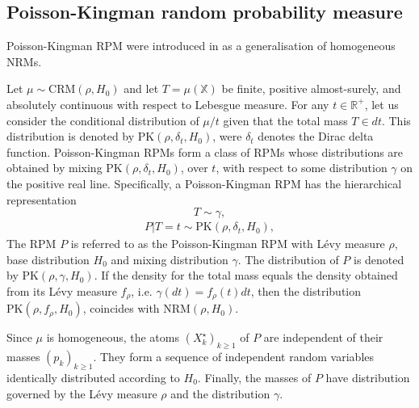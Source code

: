 
\subsection{Poisson-Kingman random probability measure} \label{PKP}
Poisson-Kingman \gls{RPM} were introduced in \cite{pitman2003pkp} as a generalisation of homogeneous NRMs. \\

\begin{definition} \label{def:PKRPM}
Let $\mu \sim \text{CRM}(\rho, H_0)$ and let $T = \mu(\mathbb{X})$ be finite, positive almost-surely, and absolutely continuous with respect to Lebesgue measure. For any $t \in \mathbb{R}^+$, let us consider the conditional distribution of $\mu/t$ given that the total mass $T \in dt$. This distribution is denoted by $\text{PK}(\rho, \delta_t , H_0)$, were $\delta_t$ denotes the Dirac delta function. Poisson-Kingman \glspl{RPM} form a class of \glspl{RPM} whose distributions are obtained by mixing $\text{PK}(\rho, \delta_t , H_0)$, over $t$, with respect to some distribution  $\gamma$ on the positive real line. Specifically, a Poisson-Kingman \gls{RPM} has the hierarchical representation
$$T \sim \gamma, $$
\vspace{-2em}
\begin{gather} \label{eq:PK}
P|T=t \sim \text{PK}(\rho, \delta_t, H_0),
\end{gather}
The \gls{RPM} $P$ is referred to as the Poisson-Kingman \gls{RPM} with Lévy measure $\rho$, base distribution $H_0$ and mixing distribution $\gamma$. The distribution of $P$ is denoted by $\text{PK}(\rho, \gamma , H_0)$. If the density for the total mass equals the density obtained from its Lévy measure $f_\rho$, i.e. $\gamma(dt) = f_\rho(t) dt$, then the distribution $\text{PK}(\rho, f_\rho , H_0)$, coincides with $\text{NRM} (\rho, H_0)$.
\end{definition}

Since $\mu$ is homogeneous, the atoms $\left(X^\star_k \right)_{k \ge 1}$ of $P$ are independent of their masses $\left(p_k \right)_{k \ge 1}$. They form a sequence of independent random variables identically distributed according to $H_0$. Finally, the masses of $P$ have distribution governed by the Lévy measure $\rho$ and the distribution $\gamma$.

